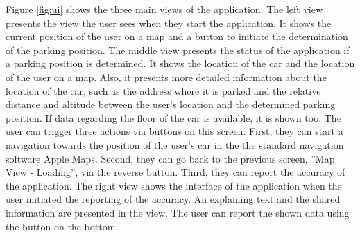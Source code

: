 Figure \ref{fig:ui} shows the three main views of the application. The left view presents the view the user sees when they start the application. It shows the current position of the user on a map and a button to initiate the determination of the parking position. The middle view presents the status of the application if a parking position is determined. It shows the location of the car and the location of the user on a map. Also, it presents more detailed information about the location of the car, such as the address where it is parked and the relative distance and altitude between the user's location and the determined parking position. If data regarding the floor of the car is available, it is shown too. The user can trigger three actions via buttons on this screen. First, they can start a navigation towards the position of the user's car in the the standard navigation software Apple Maps. Second, they can go back to the previous screen, ''Map View - Loading'', via the reverse button. Third, they can report the accuracy of the application. The right view shows the interface of the application when the user initiated the reporting of the accuracy. An explaining text and the shared information are presented in the view. The user can report the shown data using the button on the bottom. 

